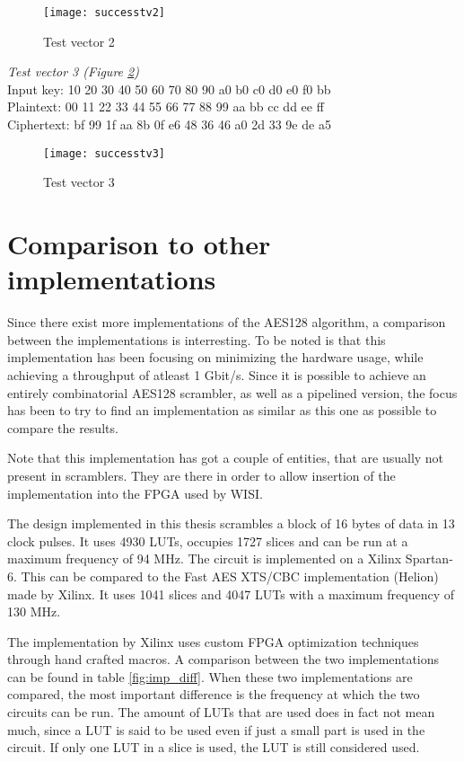 \begin{figure}
  \texttt{[image: successtv2]}
  \caption{Test vector 2}
  \label{test:2}
\end{figure}

\emph{Test vector 3 (Figure \ref{test:3})} \\
Input key: 10 20 30 40 50 60 70 80 90 a0 b0 c0 d0 e0 f0 bb\\
Plaintext: 00 11 22 33 44 55 66 77 88 99 aa bb cc dd ee ff\\
Ciphertext: bf 99 1f aa 8b 0f e6 48 36 46 a0 2d 33 9e de a5

\begin{figure}
  \texttt{[image: successtv3]}
  \caption{Test vector 3}
  \label{test:3}
\end{figure}

\section{Comparison to other implementations}
Since there exist more implementations of the AES128 algorithm, a 
comparison between the implementations is interresting. To be noted is 
that this implementation has been focusing on minimizing the hardware 
usage, while achieving a throughput of atleast 1 Gbit/s. Since it is 
possible to achieve an entirely combinatorial AES128 scrambler, as 
well as a pipelined version, the focus has been to try to find an 
implementation as similar as this one as possible to compare the 
results.

Note that this implementation has got a couple of entities, that are 
usually not present in scramblers. They are there in order to allow 
insertion of the implementation into the FPGA used by WISI.

The design implemented in this thesis scrambles a block of 16 bytes 
of data in 13 clock pulses. It uses 4930 LUTs, occupies 1727 slices 
and can be run at a maximum frequency of 94 MHz. The circuit is 
implemented on a Xilinx Spartan-6. This can be compared to the Fast 
AES XTS/CBC implementation (Helion) made by Xilinx. It uses 1041 
slices and 4047 LUTs with a maximum frequency of 130 MHz. 
\cite{Xilinx:AES} 

The implementation by Xilinx uses custom FPGA optimization techniques 
through hand crafted macros. A comparison between the two 
implementations can be found in table \ref{fig:imp_diff}. When these 
two implementations are compared, the most important difference is the 
frequency at which the two circuits can be run. The amount of LUTs 
that are used does in fact not mean much, since a LUT is said to be 
used even if just a small part is used in the circuit. If only one LUT 
in a slice is used, the LUT is still considered used. 

